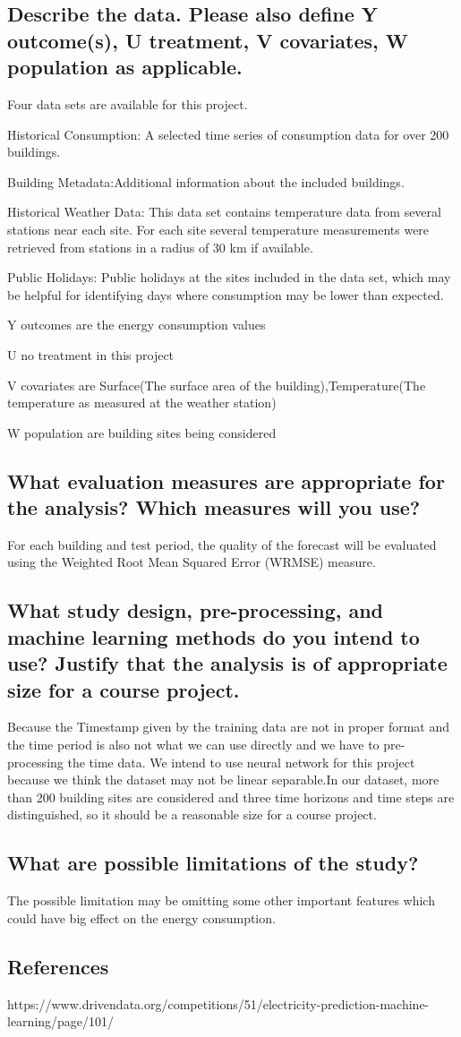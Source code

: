 \documentclass{article}
\begin{document}
\subsection{Describe the data. Please also define Y outcome(s), U treatment, V covariates, W population as applicable.}
Four data sets are available for this project.
\item Historical Consumption: A selected time series of consumption data for over 200 buildings.
\item Building Metadata:Additional information about the included buildings.
\item Historical Weather Data: This data set contains temperature data from several stations near
each site. For each site several temperature measurements were retrieved from stations in 
a radius of 30 km if available.
\item Public Holidays: Public holidays at the sites included in the data set, which may be helpful 
for identifying days where consumption may be lower than expected.

\item Y outcomes are the energy consumption values
\item U no treatment in this project
\item V covariates are Surface(The surface area of the building),Temperature(The temperature as measured at the weather station)
\item W population are building sites being considered


\subsection{What evaluation measures are appropriate for the analysis? Which measures will you use?}
For each building and test period, the quality of the forecast will be evaluated using the Weighted Root Mean Squared Error (WRMSE) measure.

\subsection{What study design, pre-processing, and machine learning methods do you intend to use? Justify that the analysis is of appropriate size for a course project.}
Because the Timestamp given by the training data are not in proper format and the time period is also not what we can use directly and we have to pre-processing the time data. We intend to use neural network for this project because we think the dataset may not be linear separable.In our dataset, more than 200 building sites are considered and three time horizons and time steps are distinguished, so it should be a reasonable size for a course project.

\subsection{What are possible limitations of the study?}
The possible limitation may be omitting some other important features which could have big effect on the energy consumption.

\subsection{References}
https://www.drivendata.org/competitions/51/electricity-prediction-machine-learning/page/101/
\end{document}
